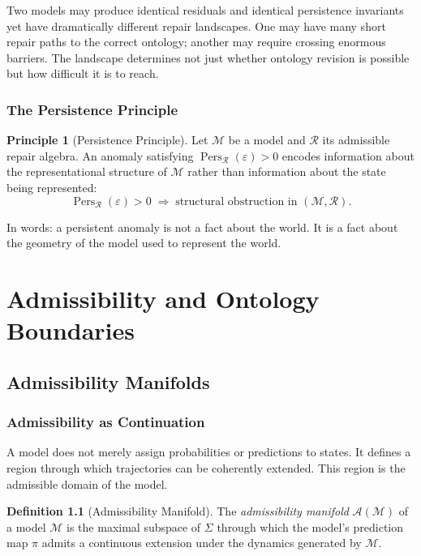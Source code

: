 \documentclass[12pt,oneside]{book}
\theoremstyle{plain}
\theoremstyle{definition}
\newtheorem{definition}[theorem]{Definition}
\newtheorem{principle}[theorem]{Principle}
\theoremstyle{remark}
\DeclareMathOperator{\Pers}{Pers}
\newcommand{\R}{\mathcal{R}}
\newcommand{\M}{\mathcal{M}}
\newcommand{\eps}{\varepsilon}
\newcommand{\1}{\mathbf{1}}
\begin{document}
Two models may produce identical residuals and identical persistence invariants yet have dramatically different repair landscapes. One may have many short repair paths to the correct ontology; another may require crossing enormous barriers. The landscape determines not just whether ontology revision is possible but how difficult it is to reach.

\section{The Persistence Principle}

\begin{principle}[Persistence Principle]
\label{principle:persistence}
Let $\M$ be a model and $\R$ its admissible repair algebra. An anomaly satisfying $\Pers_{\R}(\eps) > 0$ encodes information about the representational structure of $\M$ rather than information about the state being represented:
\[
\Pers_{\R}(\eps) > 0 \;\Longrightarrow\; \text{structural obstruction in } (\M, \R).
\]
\end{principle}

In words: a persistent anomaly is not a fact about the world. It is a fact about the geometry of the model used to represent the world.

\part{Admissibility and Ontology Boundaries}

\chapter{Admissibility Manifolds}

\section{Admissibility as Continuation}

A model does not merely assign probabilities or predictions to states. It defines a region through which trajectories can be coherently extended. This region is the admissible domain of the model.

\begin{definition}[Admissibility Manifold]
The \emph{admissibility manifold} $\mathcal{A}(\M)$ of a model $\M$ is the maximal subspace of $\Sigma$ through which the model's prediction map $\pi$ admits a continuous extension under the dynamics generated by $\M$.
\end{definition}
\end{document}

